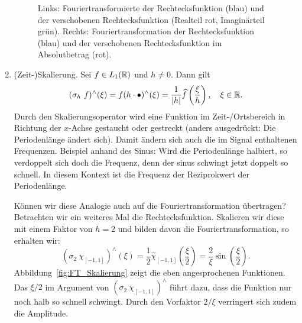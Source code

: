 \begin{remark}
\begin{enumerate}
\begin{figure}[ht]
\begin{minipage}{0.49\linewidth}
      \end{minipage}
      \caption{Links: Fouriertransformierte der Rechtecksfunktion (blau) und der verschobenen
        Rechtecksfunktion (Realteil rot, Imaginärteil grün). Rechts: Fouriertransformation der
        Rechtecksfunktion (blau) und der verschobenen Rechtecksfunktion im Absolutbetrag (rot).}
      \label{fig:Rechteck34}
    \end{figure}
		\item (Zeit-)Skalierung. Sei $ f \in L_{1}(\mathbb{R}) $ und $ h \neq 0 $. Dann gilt
  		\[
      		(\sigma_{h} \ f)^{\wedge}(\xi) 
      	= f(h \cdot \bullet)^{\wedge}(\xi) 
      	= \frac{1}{|h|} \widehat{f} \left( \frac{\xi}{h} \right), \quad \xi \in \mathbb{R}.
  		\]
  	Durch den Skalierungsoperator wird eine Funktion im Zeit-/Ortsbereich in Richtung der $x$-Achse 
  	gestaucht oder gestreckt (anders ausgedrückt: Die Periodenlänge ändert sich). Damit ändern sich
  	auch die im Signal enthaltenen Frequenzen. Beispiel anhand des Sinus: Wird die Periodenlänge 
    halbiert, so verdoppelt sich doch die Frequenz, denn der sinus schwingt jetzt doppelt so 
    schnell. In diesem Kontext ist die Frequenz der Reziprokwert der Periodenlänge.
    
    Können wir diese Analogie auch auf die Fouriertransformation übertragen? Betrachten wir ein
    weiteres Mal die Rechtecksfunktion. Skalieren wir diese mit einem Faktor von $ h = 2 $ und 
    bilden davon die Fouriertransformation, so erhalten wir:
    \[
        (\sigma_{2} \ \chi_{[-1,1]})^{\wedge}(\xi)
      = \frac{1}{2} \widehat{\chi}_{[-1,1]} \left( \frac{\xi}{2} \right) 
      = \frac{2}{\xi} \sin \left( \frac{\xi}{2} \right).
    \]
    Abbildung~\ref{fig:FT_Skalierung} zeigt die eben angesprochenen Funktionen. Das 
    $ \xi /2 $ im Argument von $ (\sigma_{2} \ \chi_{[-1,1]})^{\wedge} $ führt dazu, dass die
    Funktion nur noch halb so schnell schwingt. Durch den Vorfaktor $ 2 / \xi $ verringert sich
    zudem die Amplitude.
    
    

\end{enumerate}
\end{remark}

